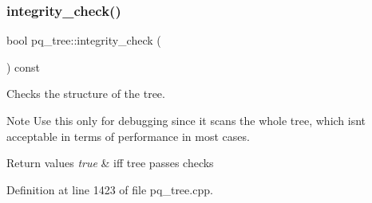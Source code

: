 \subsubsection{\texorpdfstring{integrity\+\_\+check()}{integrity\_check()}}
{\footnotesize\ttfamily bool pq\+\_\+tree\+::integrity\+\_\+check (\begin{DoxyParamCaption}{ }\end{DoxyParamCaption}) const}



Checks the structure of the tree. 

\begin{DoxyNote}{Note}
Use this only for debugging since it scans the whole tree, which isn\textquotesingle{}t acceptable in terms of performance in most cases.
\end{DoxyNote}

\begin{DoxyRetVals}{Return values}
{\em true} & iff tree passes checks \\
\hline
\end{DoxyRetVals}


Definition at line 1423 of file pq\+\_\+tree.\+cpp.


